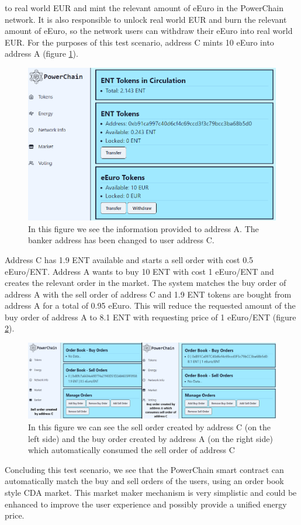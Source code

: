 to real world EUR and mint the relevant amount of eEuro in the PowerChain network. It is also responsible to unlock real world EUR and burn the relevant amount of eEuro, so the network users
can withdraw their eEuro into real world EUR. For the purposes of this test scenario, address C mints 10 eEuro into address A (figure \ref{fig:eEuro_minted}).\\ 
\begin{figure}[h!]
    \centering
    \includegraphics[width=\linewidth,frame,scale=0.7]{Figures/eEuro_minted.png}
    \caption{In this figure we see the information provided to address A. The banker address has been changed to user address C.}
    \label{fig:eEuro_minted}
\end{figure}
Address C has 1.9 ENT available and starts a sell order with cost 0.5 eEuro/ENT. Address A wants to buy 10 ENT with cost 1 eEuro/ENT and creates the relevant order in the market.
The system matches the buy order of address A with the sell order of address C and 1.9 ENT tokens are bought from address A for a total of 0.95 eEuro. This will reduce the requested
amount of the buy order of address A to 8.1 ENT with requesting price of 1 eEuro/ENT (figure \ref{fig:order_book}).\\ 
\begin{figure}[h!]
    \centering
    \includegraphics[width=\linewidth,frame,scale=1]{Figures/order_book.png}
    \caption{In this figure we can see the sell order created by address C (on the left side) and the buy order created by address A (on the right side) which automatically consumed the sell
    order of address C}
    \label{fig:order_book}
\end{figure}
Concluding this test scenario, we see that the PowerChain smart contract can automatically match the buy and sell orders of the users, using an order book style CDA market. This market maker mechanism
is very simplistic and could be enhanced to improve the user experience and possibly provide a unified energy price.